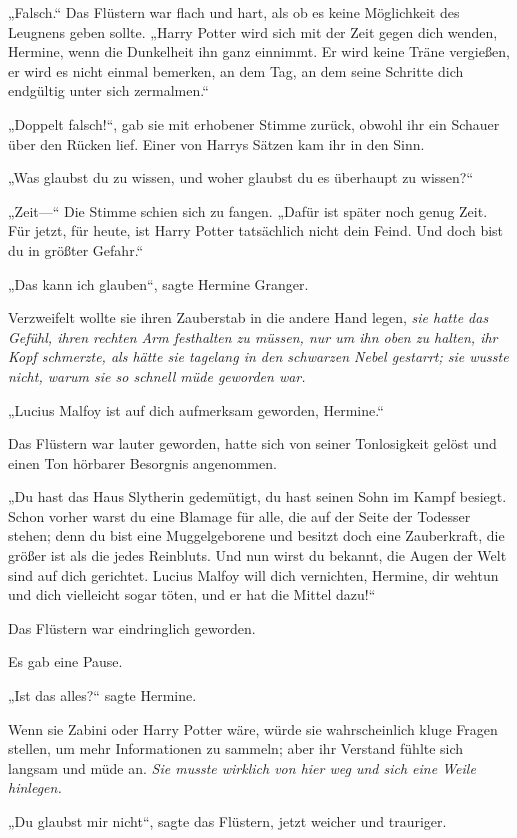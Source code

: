 {„Falsch.“ Das Flüstern war flach und hart, als ob es keine Möglichkeit des Leugnens geben sollte. „Harry Potter wird sich mit der Zeit gegen dich wenden, Hermine, wenn die Dunkelheit ihn ganz einnimmt. Er wird keine Träne vergießen, er wird es nicht einmal bemerken, an dem Tag, an dem seine Schritte dich endgültig unter sich zermalmen.“

„Doppelt falsch!“, gab sie mit erhobener Stimme zurück, obwohl ihr ein Schauer über den Rücken lief. Einer von Harrys Sätzen kam ihr in den Sinn.

„Was glaubst du zu wissen, und woher glaubst du es überhaupt zu wissen?“

„Zeit—“ Die Stimme schien sich zu fangen. „Dafür ist später noch genug Zeit. Für jetzt, für heute, ist Harry Potter tatsächlich nicht dein Feind. Und doch bist du in größter Gefahr.“

„Das kann ich glauben“, sagte Hermine Granger.

Verzweifelt wollte sie ihren Zauberstab in die andere Hand legen, \emph{sie hatte das Gefühl, ihren rechten Arm festhalten zu müssen, nur um ihn oben zu halten, ihr Kopf schmerzte, als hätte sie tagelang in den schwarzen Nebel gestarrt; sie wusste nicht, warum sie so schnell müde geworden war.}

„Lucius Malfoy ist auf dich aufmerksam geworden, Hermine.“

Das Flüstern war lauter geworden, hatte sich von seiner Tonlosigkeit gelöst und einen Ton hörbarer Besorgnis angenommen.

„Du hast das Haus Slytherin gedemütigt, du hast seinen Sohn im Kampf besiegt. Schon vorher warst du eine Blamage für alle, die auf der Seite der Todesser stehen; denn du bist eine Muggelgeborene und besitzt doch eine Zauberkraft, die größer ist als die jedes Reinbluts. Und nun wirst du bekannt, die Augen der Welt sind auf dich gerichtet. Lucius Malfoy will dich vernichten, Hermine, dir wehtun und dich vielleicht sogar töten, und er hat die Mittel dazu!“

Das Flüstern war eindringlich geworden.

Es gab eine Pause.

„Ist das alles?“ sagte Hermine.

Wenn sie Zabini oder Harry Potter wäre, würde sie wahrscheinlich kluge Fragen stellen, um mehr Informationen zu sammeln; aber ihr Verstand fühlte sich langsam und müde an. \emph{Sie musste wirklich von hier weg und sich eine Weile hinlegen.}

„Du glaubst mir nicht“, sagte das Flüstern, jetzt weicher und trauriger.

}
